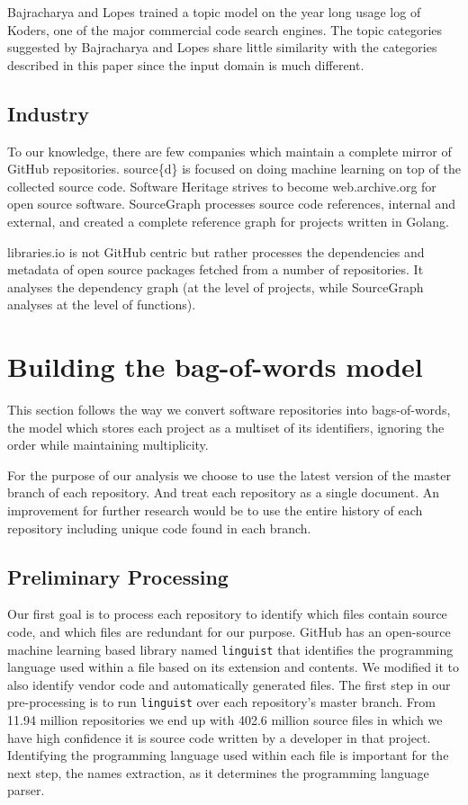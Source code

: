 \documentclass[conference,10pt]{IEEEtran}
\begin{document}
Bajracharya and Lopes \cite{Bajracharya:2009:MST:1590955.1591146} trained a topic model on the year long usage log of Koders, one of the major commercial code search engines. The topic categories suggested by Bajracharya and Lopes share little similarity with the categories described in this paper since the input domain is much different.

\subsection{Industry}
To our knowledge, there are few companies which maintain a complete mirror of GitHub repositories. source\{d\} \cite{sourced} is focused on doing machine learning on top of the collected source code. Software Heritage \cite{SoftwareHeritage} strives to become web.archive.org for open source software. SourceGraph \cite{SourceGraph} processes source code references, internal and external, and created a complete reference graph for projects written in Golang.

libraries.io \cite{libraries.io} is not GitHub centric but rather processes the dependencies and metadata of open source packages fetched from a number of repositories. It analyses the dependency graph (at the level of projects, while SourceGraph analyses at the level of functions).

\section{Building the bag-of-words model} \label{bag_of_words}

This section follows the way we convert software repositories into bags-of-words, the model which stores each project as a multiset of its identifiers, ignoring the order while maintaining multiplicity. 

For the purpose of our analysis we choose to use the latest version of the master branch of each repository. And treat each repository as a single document. An improvement for further research would be to use the entire history of each repository including unique code found in each branch.

\subsection{Preliminary Processing}

Our first goal is to process each repository to identify which files contain source code, and which files are redundant for our purpose. GitHub has an open-source machine learning based library named \texttt{linguist} \cite{linguist} that identifies the programming language used within a file based on its extension and contents. We modified it to also identify vendor code and automatically generated files. The first step in our pre-processing is to run \texttt{linguist} over each repository's master branch. From 11.94 million repositories we end up with 402.6 million source files in which we have high confidence it is source code written by a developer in that project. Identifying the programming language used within each file is important for the next step, the names extraction, as it determines the programming language parser.
\end{document}
